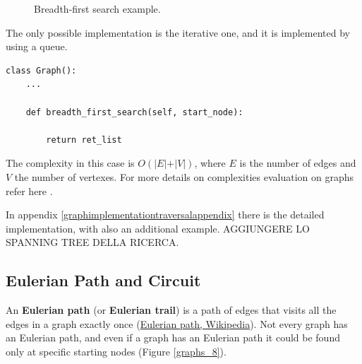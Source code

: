 \begin{figure}[H]
\centering
{}  
\caption[Breadth-first search example.]{Breadth-first search example.}
\label{graphs_7}
\end{figure}

The only possible implementation is the iterative one, and it is implemented by using a queue.

\begin{lstlisting}[firstnumber=1, caption={Recursive implementation of a depth-first search.}]
class Graph():
	...
	
	def breadth_first_search(self, start_node):
		
		return ret_list
\end{lstlisting}

The complexity in this case is \(O(\vert E \vert + \vert V \vert)\), where \(E\) is the number of edges and \(V\) the number of vertexes. For more details on complexities evaluation on graphs refer here \cite{goodrich2013data}.

In appendix \ref{graphimplementationtraversalappendix} there is the detailed implementation, with also an additional example.
AGGIUNGERE LO SPANNING TREE DELLA RICERCA.
\subsection{Eulerian Path and Circuit}
An \textbf{Eulerian path} (or \textbf{Eulerian trail}) is a path of edges that visits all the edges in a graph exactly once \cite{wikieulerianpathcircuit} (\href{https://en.wikipedia.org/wiki/Eulerian_path}{Eulerian path, Wikipedia}). Not every graph has an Eulerian path, and even if a graph has an Eulerian path it could be found only at specific starting nodes (Figure \ref{graphs_8}).

